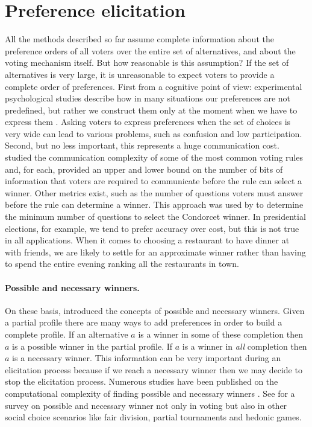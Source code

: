\newpage
\section{Preference elicitation}
\label{sec:litMNMX}

All the methods described so far assume complete information about the preference orders of all voters over the entire set of alternatives, and about the voting mechanism itself. But how reasonable is this assumption?
If the set of alternatives is very large, it is unreasonable to expect voters to provide a complete order of preferences. First from a cognitive point of view: experimental psychological studies describe how in many situations our preferences are not predefined, but rather we construct them only at the moment when we have to express them \citep{Lichtenstein2006}. Asking voters to express preferences when the set of choices is very wide can lead to various problems, such as confusion and low participation.
Second, but no less important, this represents a huge communication cost. \citet{Conitzer2005} studied the communication complexity of some of the most common voting rules and, for each, provided an upper and lower bound on the number of bits of information that voters are required to communicate before the rule can select a winner. Other metrics exist, such as the number of questions voters must answer before the rule can determine a winner. This approach was used by \citet{Procaccia2008} to determine the minimum number of questions to select the Condorcet winner.
In presidential elections, for example, we tend to prefer accuracy over cost, but this is not true in all applications. When it comes to choosing a restaurant to have dinner at with friends, we are likely to settle for an approximate winner rather than having to spend the entire evening ranking all the restaurants in town.
\paragraph{Possible and necessary winners.}
On these basis, \citet{Konczak05} introduced the concepts of possible and necessary winners. Given a partial profile there are many ways to add preferences in order to build a complete profile. If an alternative $a$ is a winner in some of these completion then $a$ is a possible winner in the partial profile. If $a$ is a winner in \textit{all} completion then $a$ is a necessary winner. This information can be very important during an elicitation process because if we reach a necessary winner then we may decide to stop the elicitation process.
Numerous studies have been published on the computational complexity of finding possible and necessary winners \citep{Konczak05,Pini2007,Walsh2007,Xia2008,Xia2011,Baumeister2012}.
See \citet{Lang2020} for a survey on possible and necessary winner not only in voting but also in other social choice scenarios like fair division, partial tournaments and hedonic games.


